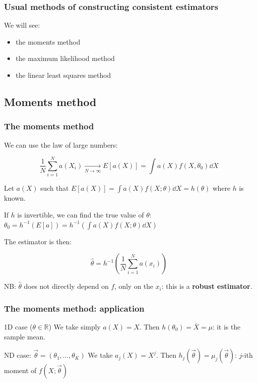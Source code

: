 \documentclass[9pt]{beamer}
\newif\ifmyhide
\newcommand\myhide[1]{%
\ifmyhide \vspace{15pt} \begin{center} \myexample{(blackboard)}\end{center} \vspace{15pt} \else #1 \fi
}
\begin{document}
\begin{frame}
 \frametitle{Usual methods of constructing consistent estimators}
 
 
 We will see:
 
 \begin{itemize}
  \item the moments method
  \item the maximum likelihood method
  \item the linear least squares method
 \end{itemize}
 

 
\end{frame}

\subsection{Moments method}

\begin{frame}
 \frametitle{The moments method}
 
 We can use the law of large numbers:
 
 $$\frac{1}{N} \sum_{i=1}^N a(X_i) \xrightarrow[N\to\infty]{} E[a(X)] = \int a(X)f(X,\theta_0)\dd X$$
 
 Let $a(X)$ such that $E[a(X)] = \int a(X) f(X;\theta) \dd X = h(\theta)$ where $h$ is known. 
 
 If $h$ is invertible, we can find the true value of $\theta$: 
 $\theta_0 = h^{-1}(E[a]) = h^{-1}\left(\int a(X) f(X;\theta) \dd X\right)$
 
 \begin{block}{}
 The estimator is then:
 
 $$\hat{\theta} = h^{-1} \left( \frac{1}{N} \sum_{i=1}^N a(x_i) \right)$$
 \end{block}
 
 NB: $\hat{\theta}$ does not directly depend on $f$, only on the $x_i$: this is a \textbf{robust estimator}.
\end{frame}

\begin{frame}
 \frametitle{The moments method: application}
 
 \myhide{
 \begin{block}{1D case ($\theta \in \mathbb{R}$)}
  We take simply $a(X) = X$. Then $h(\theta_0) = \bar{X} = \mu$: it is the sample mean.
 \end{block}
 
 \begin{block}{ND case: $\vec{\theta} = (\theta_1,\dots,\theta_K)$}
  We take $a_j(X) = X^j$. Then $h_j(\vec{\theta}) = \mu_j(\vec{\theta})$: $j$-ith moment of $f(X;\vec{\theta})$
 \end{block}
}

\end{frame}
\end{document}

